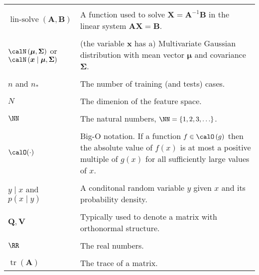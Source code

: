 \begin{longtable}{lp{}}
    \\\\
    $\operatorname{lin-solve} \left( \bm{A}, \bm{B} \right)$                                                   & A function used to solve $\bm{X} = \bm{A}^{-1} \bm{B}$ in the linear system $\bm{A} \bm{X} = \bm{B}$.
    \\\\
    $\calN \left( \bm{\mu} , \bm{\Sigma} \right)$ or $\calN \left( \bm{x} \mid \bm{\mu} , \bm{\Sigma} \right)$ & (the variable $\bm{x}$ has a) Multivariate Gaussian distribution with mean vector $\bm{\mu}$ and covariance $\bm{\Sigma}$.
    \\\\
    $n$ and $n_{\ast}$                                                                                         & The number of training (and tests) cases.
    \\\\
    $N$                                                                                                        & The dimenion of the feature space.
    \\\\
    $\NN$                                                                                                      & The natural numbers, $\NN = \left\{ 1,2,3,\ldots \right\}$.
    \\\\
    $\calO (\cdot)$                                                                                            & Big-O notation. If a function $f \in \calO \left( g \right)$ then the absolute value of $f(x)$ is at most a positive multiple of $g(x)$ for all sufficiently large values of $x$.
    \\\\
    $y \mid x$ and $p \left( x \mid y \right)$                                                                 & A conditonal random variable $y$ given $x$ and its probability density.
    \\\\
    $\bm{Q}, \bm{V}$                                                                                           & Typically used to denote a matrix with orthonormal structure.
    \\\\
    $\RR$                                                                                                      & The real numbers.
    \\\\
    $\operatorname{tr} \left( \bm{A} \right)$                                                                  & The trace of a matrix.

\end{longtable}
